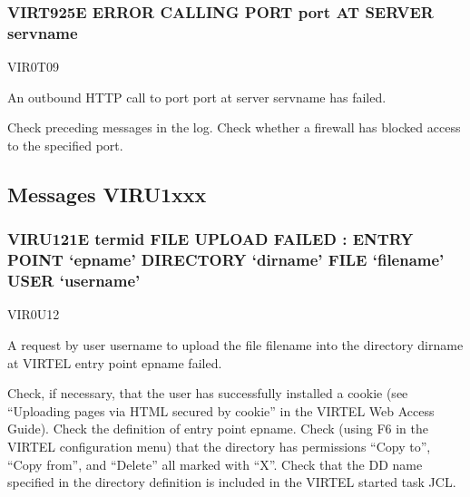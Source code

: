 \documentclass[letterpaper,10pt,english]{sphinxmanual}
\begin{document}
\subsubsection{VIRT925E ERROR CALLING PORT port AT SERVER servname}
\label{\detokenize{messages:virt925e-error-calling-port-port-at-server-servname}}\begin{description}
\sphinxAtStartPar
VIR0T09

\sphinxAtStartPar
An outbound HTTP call to port port at server servname has failed.

\sphinxAtStartPar
Check preceding messages in the log. Check whether a firewall has blocked access to the specified port.

\end{description}


\subsection{Messages VIRU1xxx}
\label{\detokenize{messages:messages-viru1xxx}}

\subsubsection{VIRU121E termid FILE UPLOAD FAILED : ENTRY POINT ‘epname’ DIRECTORY ‘dirname’ FILE ‘filename’ USER ‘username’}
\label{\detokenize{messages:viru121e-termid-file-upload-failed-entry-point-epname-directory-dirname-file-filename-user-username}}\begin{description}
\sphinxAtStartPar
VIR0U12

\sphinxAtStartPar
A request by user username to upload the file filename into the directory dirname at VIRTEL entry point epname failed.

\sphinxAtStartPar
Check, if necessary, that the user has successfully installed a cookie (see “Uploading pages via HTML secured by cookie” in the VIRTEL Web Access Guide). Check the definition of entry point epname. Check (using F6 in the VIRTEL configuration menu) that the directory has permissions “Copy to”, “Copy from”, and “Delete” all marked with “X”. Check that the DD name specified in the directory definition is included in the VIRTEL started task JCL.

\end{description}
\end{document}
